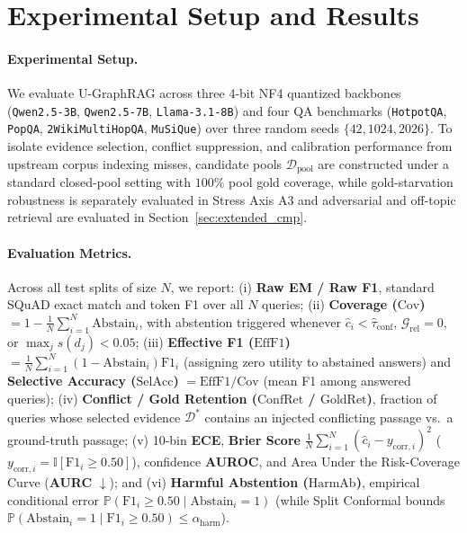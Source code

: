 \documentclass[11pt]{article}
\begin{document}
\section{Experimental Setup and Results}

\paragraph{Experimental Setup.}
We evaluate U-GraphRAG across three 4-bit NF4 quantized backbones (\texttt{Qwen2.5-3B}, \texttt{Qwen2.5-7B}, \texttt{Llama-3.1-8B}) and four QA benchmarks (\texttt{HotpotQA}, \texttt{PopQA}, \texttt{2WikiMultiHopQA}, \texttt{MuSiQue}) over three random seeds $\{42, 1024, 2026\}$. To isolate evidence selection, conflict suppression, and calibration performance from upstream corpus indexing misses, candidate pools $\mathcal{D}_{\text{pool}}$ are constructed under a standard closed-pool setting with $100\%$ pool gold coverage, while gold-starvation robustness is separately evaluated in Stress Axis A3 and adversarial and off-topic retrieval are evaluated in Section~\ref{sec:extended_cmp}.

\paragraph{Evaluation Metrics.} Across all test splits of size $N$, we report: (i) \textbf{Raw EM / Raw F1}, standard SQuAD exact match and token F1 over all $N$ queries; (ii) \textbf{Coverage ($\text{Cov}$)} $= 1 - \frac{1}{N}\sum_{i=1}^N \text{Abstain}_i$, with abstention triggered whenever $\hat{c}_i < \hat{\tau}_{\text{conf}}$, $\mathcal{G}_{\text{rel}}=0$, or $\max_j s(d_j) < 0.05$; (iii) \textbf{Effective F1 ($\text{EffF1}$)} $= \frac{1}{N}\sum_{i=1}^N (1-\text{Abstain}_i)\text{F1}_i$ (assigning zero utility to abstained answers) and \textbf{Selective Accuracy ($\text{SelAcc}$)} $= \text{EffF1}/\text{Cov}$ (mean F1 among answered queries); (iv) \textbf{Conflict / Gold Retention ($\text{ConfRet}$ / $\text{GoldRet}$)}, fraction of queries whose selected evidence $\mathcal{D}^*$ contains an injected conflicting passage vs.\ a ground-truth passage; (v) 10-bin \textbf{ECE}, \textbf{Brier Score} $\frac{1}{N}\sum_{i=1}^N (\hat{c}_i - y_{\text{corr},i})^2$ ($y_{\text{corr},i} = \mathbb{I}[\text{F1}_i \ge 0.50]$), confidence \textbf{AUROC}, and Area Under the Risk-Coverage Curve (\textbf{AURC} $\downarrow$); and (vi) \textbf{Harmful Abstention ($\text{HarmAb}$)}, empirical conditional error $\mathbb{P}(\text{F1}_i \ge 0.50 \mid \text{Abstain}_i = 1)$ (while Split Conformal bounds $\mathbb{P}(\text{Abstain}_i = 1 \mid \text{F1}_i \ge 0.50) \le \alpha_{\text{harm}}$).
\end{document}
